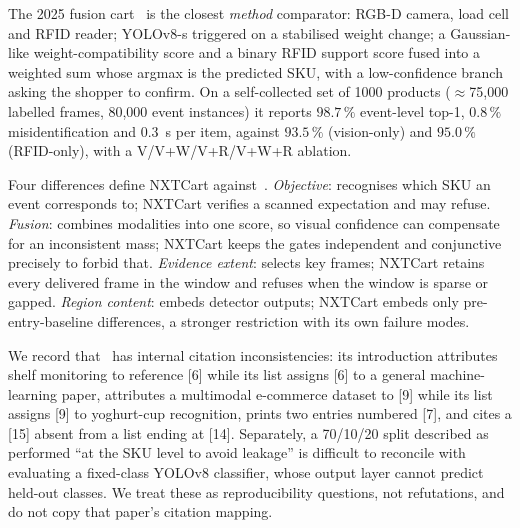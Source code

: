 \documentclass[conference]{IEEEtran}
\begin{document}
The 2025 fusion cart~\cite{R01} is the closest \emph{method} comparator: RGB-D camera, load cell and
RFID reader; YOLOv8-s triggered on a stabilised weight change; a Gaussian-like weight-compatibility
score and a binary RFID support score fused into a weighted sum whose argmax is the predicted SKU,
with a low-confidence branch asking the shopper to confirm. On a self-collected set of 1000 products
($\approx$75{,}000 labelled frames, 80{,}000 event instances) it reports $98.7\,\%$ event-level top-1,
$0.8\,\%$ misidentification and $0.3$~s per item, against $93.5\,\%$ (vision-only) and $95.0\,\%$
(RFID-only), with a V/V+W/V+R/V+W+R ablation.

Four differences define NXTCart against~\cite{R01}. \emph{Objective}: \cite{R01} recognises which SKU
an event corresponds to; NXTCart verifies a scanned expectation and may refuse. \emph{Fusion}:
\cite{R01} combines modalities into one score, so visual confidence can compensate for an
inconsistent mass; NXTCart keeps the gates independent and conjunctive precisely to forbid that.
\emph{Evidence extent}: \cite{R01} selects key frames; NXTCart retains every delivered frame in the
window and refuses when the window is sparse or gapped. \emph{Region content}: \cite{R01} embeds
detector outputs; NXTCart embeds only pre-entry-baseline differences, a stronger restriction with its
own failure modes.

We record that~\cite{R01} has internal citation inconsistencies: its introduction attributes shelf
monitoring to reference [6] while its list assigns [6] to a general machine-learning paper, attributes
a multimodal e-commerce dataset to [9] while its list assigns [9] to yoghurt-cup recognition, prints
two entries numbered [7], and cites a [15] absent from a list ending at [14]. Separately, a 70/10/20
split described as performed ``at the SKU level to avoid leakage'' is difficult to reconcile with
evaluating a fixed-class YOLOv8 classifier, whose output layer cannot predict held-out classes. We
treat these as reproducibility questions, not refutations, and do not copy that paper's citation
mapping.
\end{document}
